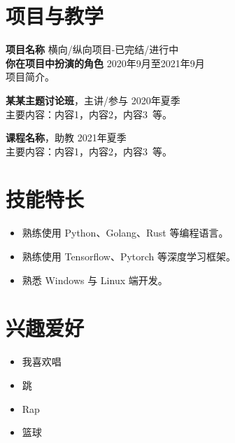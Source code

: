 \documentclass[11pt]{article}
\begin{document}
    \section{\makebox[\widthof{\faChalkboardTeacher}][c]{\color{primary_color}{\faChalkboardTeacher}}\quad 项目与教学}
    {\large{\textbf{项目名称}}} \hfill {横向/纵向项目-已完结/进行中}\\
    \textbf{你在项目中扮演的角色} \hfill 2020年9月至2021年9月\\
    项目简介。

    \vspace{0.5em}
    {\large{\textbf{某某主题讨论班}}}，主讲/参与 \hfill {2020年夏季}\\
    主要内容：内容1，内容2，内容3\ 等。
    
    \vspace{0.5em}
    {\large{\textbf{课程名称}}}，助教 \hfill {2021年夏季}\\
    主要内容：内容1，内容2，内容3\ 等。
    
    \begin{minipage}[t]{0.6\textwidth}
        \section{\makebox[\widthof{\faWrench}][c]{\color{primary_color}{\faWrench}}\quad 技能特长}
        \begin{itemize}
            \item 熟练使用 Python、Golang、Rust 等编程语言。
            \item 熟练使用 Tensorflow、Pytorch 等深度学习框架。
            \item 熟悉 Windows 与 Linux 端开发。
        \end{itemize}
    \end{minipage}
    \hfill
    \begin{minipage}[t]{0.35\textwidth}
        \section{\makebox[\widthof{\faStar}][c]{\color{primary_color}{\faStar}}\quad 兴趣爱好}
        \begin{itemize}
            \item 我喜欢唱
            \item 跳
            \item Rap
            \item 篮球
        \end{itemize}
    \end{minipage}
    
\end{document}
